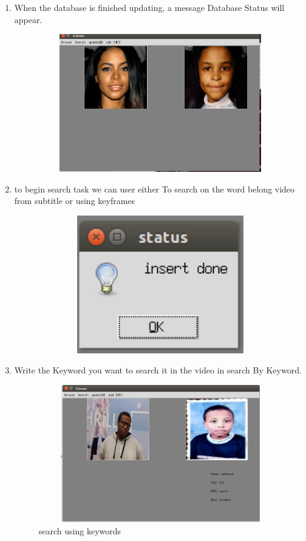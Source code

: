 \documentclass[pdftex,10pt,a4paper,oneside]{article}
\begin{document}
\begin{enumerate}
	
	
	\item 	When the database is finished updating, a message Database Status will appear.
	\begin{figure}[H]
		\centering
		\includegraphics[width=120mm,height=60mm]{fig/13.png}
	\end{figure}
\pagebreak
		\item to begin search task we can user either To search on the word belong video from subtitle or using keyframes 
		\begin{figure}[H]
			\centering
			\includegraphics[width=120mm,height=60mm]{fig/8.png}
		\end{figure}
	
	
		\item 	Write the Keyword you want to search it in the video in search By Keyword.
		\begin{figure}[H]
	\centering
	\includegraphics[width=120mm,height=60mm]{fig/16.png}
	\caption{search using keywords }
	\label{search using keywords}
\end{figure}


\end{enumerate}
\end{document}
